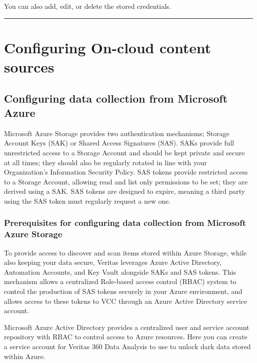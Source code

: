 \documentclass[letterpaper,10pt,english]{sphinxmanual}
\begin{document}
You can also add, edit, or delete the stored credentials.


\bigskip\hrule\bigskip



\section{Configuring On-cloud content sources}
\label{\detokenize{mcdmp_app_ug:configuring-on-cloud-content-sources}}

\subsection{Configuring data collection from Microsoft Azure}
\label{\detokenize{mcdmp_app_ug:configuring-data-collection-from-microsoft-azure}}
Microsoft Azure Storage provides two authentication mechanisms; Storage Account Keys (SAK) or Shared Access Signatures (SAS). SAKs provide full unrestricted access to a Storage Account and should be kept private and secure at all times; they should also be regularly rotated in line with your Organization’s Information Security Policy. SAS tokens provide restricted access to a Storage Account, allowing read and list only permissions to be set; they are derived using a SAK. SAS tokens are designed to expire, meaning a third party using the SAS token must regularly request a new one.


\subsubsection{Prerequisites for configuring data collection from Microsoft Azure Storage}
\label{\detokenize{mcdmp_app_ug:prerequisites-azure}}\label{\detokenize{mcdmp_app_ug:prerequisites-for-configuring-data-collection-from-microsoft-azure-storage}}
To provide access to discover and scan items stored within Azure Storage, while also keeping your data secure, Veritas leverages Azure Active Directory, Automation Accounts, and Key Vault alongside SAKs and SAS tokens. This mechanism allows a centralized Role-based access control (RBAC) system to control the production of SAS tokens securely in your Azure environment, and allows access to these tokens to VCC through an Azure Active Directory service account.

Microsoft Azure Active Directory provides a centralized user and service account repository with RBAC to control access to Azure resources. Here you can create a service account for Veritas 360 Data Analysis to use to unlock dark data stored within Azure.
\end{document}
